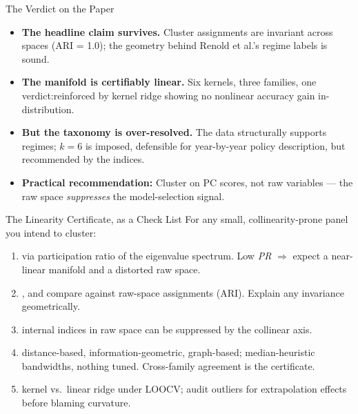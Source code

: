 \documentclass[10pt,aspectratio=169]{beamer}
\newcommand{\pc}[1]{PC#1}
\newcommand{\ari}{ARI}
\newcommand{\pr}{\textit{PR}}
\begin{document}
\begin{frame}{The Verdict on the Paper}
  \begin{itemize}
    \item[{\color{ascTeal600}\checkmark}] \textbf{The headline claim survives.}
      Cluster assignments are invariant across spaces (\ari{} = 1.0);
      the geometry behind Renold et al.'s regime labels is sound.
    \item[{\color{ascTeal600}\checkmark}] \textbf{The manifold is certifiably
      linear.} Six kernels, three families, one verdict:reinforced by
      kernel ridge showing no nonlinear accuracy gain in-distribution.
    \item[{\color{ascSlate400}$\circ$}] \textbf{But the taxonomy is
      over-resolved.} The data structurally supports  regimes;
      $k=6$ is imposed, defensible for year-by-year policy description, but 
      recommended by the indices.
    \item[{\color{ascSlate400}$\circ$}] \textbf{Practical recommendation:}
      Cluster on \pc{} scores, not raw variables --- the raw space
      \emph{suppresses} the model-selection signal.
  \end{itemize}
\end{frame}


\begin{frame}{The Linearity Certificate, as a Check List}
  For any small, collinearity-prone panel you intend to cluster:
  \begin{enumerate}
    \item {} via participation ratio of
      the eigenvalue spectrum. Low \pr{} $\Rightarrow$ expect a near-linear
      manifold and a distorted raw space.
    \item \teal{Cluster on \pc{} scores}, and compare against raw-space
      assignments (\ari{}). Explain any invariance geometrically.
    \item {} internal indices in raw
      space can be suppressed by the collinear axis.
    \item {}
      distance-based, information-geometric, graph-based; median-heuristic
      bandwidths, nothing tuned. Cross-family agreement is the certificate.
    \item {} kernel vs.\ linear
      ridge under LOOCV; audit outliers for extrapolation effects before
      blaming curvature.
  \end{enumerate}
\end{frame}
\end{document}
